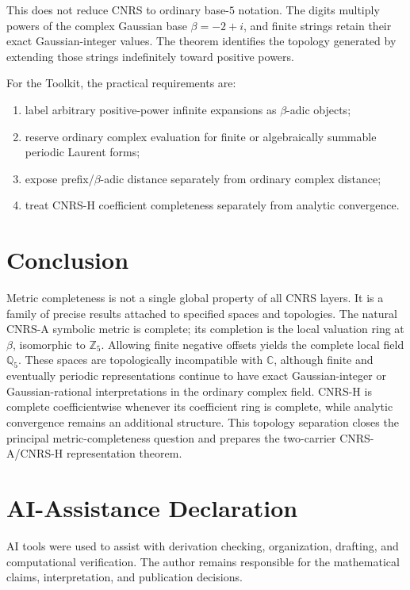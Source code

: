 \documentclass[11pt]{article}
\newcommand{\Z}{\mathbb Z}
\newcommand{\Q}{\mathbb Q}
\newcommand{\C}{\mathbb C}
\begin{document}
This does not reduce CNRS to ordinary base-$5$ notation.  The digits multiply powers of the complex Gaussian base $\beta=-2+i$, and finite strings retain their exact Gaussian-integer values.  The theorem identifies the topology generated by extending those strings indefinitely toward positive powers.

For the Toolkit, the practical requirements are:
\begin{enumerate}
\item label arbitrary positive-power infinite expansions as $\beta$-adic objects;
\item reserve ordinary complex evaluation for finite or algebraically summable periodic Laurent forms;
\item expose prefix/$\beta$-adic distance separately from ordinary complex distance;
\item treat CNRS-H coefficient completeness separately from analytic convergence.
\end{enumerate}

\section{Conclusion}

Metric completeness is not a single global property of all CNRS layers.  It is a family of precise results attached to specified spaces and topologies.  The natural CNRS-A symbolic metric is complete; its completion is the local valuation ring at $\beta$, isomorphic to $\Z_5$.  Allowing finite negative offsets yields the complete local field $\Q_5$.  These spaces are topologically incompatible with $\C$, although finite and eventually periodic representations continue to have exact Gaussian-integer or Gaussian-rational interpretations in the ordinary complex field.  CNRS-H is complete coefficientwise whenever its coefficient ring is complete, while analytic convergence remains an additional structure.  This topology separation closes the principal metric-completeness question and prepares the two-carrier CNRS-A/CNRS-H representation theorem.

\section*{AI-Assistance Declaration}
AI tools were used to assist with derivation checking, organization, drafting, and computational verification.  The author remains responsible for the mathematical claims, interpretation, and publication decisions.
\end{document}
